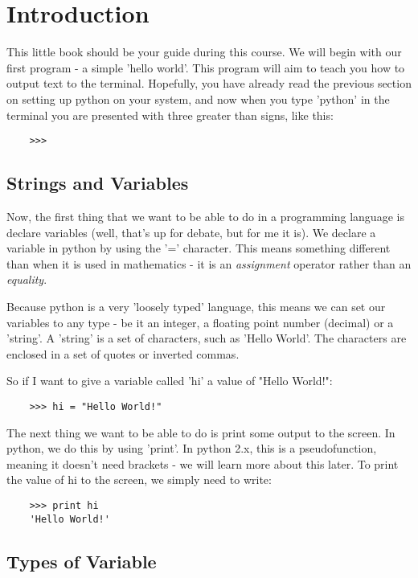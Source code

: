 \section{Introduction}

This little book should be your guide during this course. We will begin with
our first program - a simple 'hello world'. This program will aim to teach you
how to output text to the terminal. Hopefully, you have already read the
previous section on setting up python on your system, and now when you type
'python' in the terminal you are presented with three greater than signs, like
this:

\begin{lstlisting}
    >>>
\end{lstlisting}

\subsection{Strings and Variables}

Now, the first thing that we want to be able to do in a programming language is
declare variables (well, that's up for debate, but for me it is). We declare a
variable in python by using the '=' character. This means something different
than when it is used in mathematics - it is an \emph{assignment} operator rather
than an \emph{equality}.

Because python is a very 'loosely typed' language, this means we can set our
variables to any type - be it an integer, a floating point number (decimal) or
a 'string'. A 'string' is a set of characters, such as 'Hello World'. The
characters are enclosed in a set of quotes or inverted commas.

So if I want to give a variable called 'hi' a value of "Hello World!":

\begin{lstlisting}
    >>> hi = "Hello World!"
\end{lstlisting}

The next thing we want to be able to do is print some output to the screen. In
python, we do this by using 'print'. In python 2.x, this is a pseudofunction,
meaning it doesn't need brackets - we will learn more about this later. To print
the value of hi to the screen, we simply need to write:

\begin{lstlisting}
    >>> print hi
    'Hello World!'
\end{lstlisting}

\subsection{Types of Variable}

